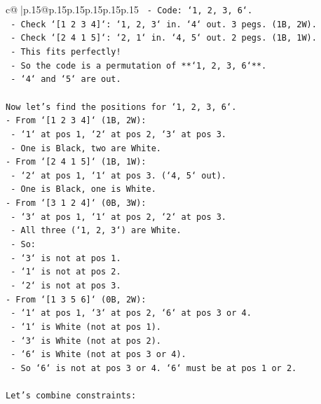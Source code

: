 \documentclass{article}
\begin{document}
{\begin{supertabular}{c@{$\;$}|p{.15\linewidth}@{}p{.15\linewidth}p{.15\linewidth}p{.15\linewidth}p{.15\linewidth}p{.15\linewidth}}
{{{\texttt{        {-} Code: `1, 2, 3, 6`.} \\
\texttt{        {-} Check `{[}1 2 3 4{]}`: `1, 2, 3` in. `4` out. 3 pegs. (1B, 2W).} \\
\texttt{        {-} Check `{[}2 4 1 5{]}`: `2, 1` in. `4, 5` out. 2 pegs. (1B, 1W).} \\
\texttt{        {-} This fits perfectly!} \\
\texttt{        {-} So the code is a permutation of **`1, 2, 3, 6`**.} \\
\texttt{        {-} `4` and `5` are out.} \\
\\ 
\texttt{Now let's find the positions for `1, 2, 3, 6`.} \\
\texttt{{-} From `{[}1 2 3 4{]}` (1B, 2W):} \\
\texttt{    {-} `1` at pos 1, `2` at pos 2, `3` at pos 3.} \\
\texttt{    {-} One is Black, two are White.} \\
\texttt{{-} From `{[}2 4 1 5{]}` (1B, 1W):} \\
\texttt{    {-} `2` at pos 1, `1` at pos 3. (`4, 5` out).} \\
\texttt{    {-} One is Black, one is White.} \\
\texttt{{-} From `{[}3 1 2 4{]}` (0B, 3W):} \\
\texttt{    {-} `3` at pos 1, `1` at pos 2, `2` at pos 3.} \\
\texttt{    {-} All three (`1, 2, 3`) are White.} \\
\texttt{    {-} So:} \\
\texttt{        {-} `3` is not at pos 1.} \\
\texttt{        {-} `1` is not at pos 2.} \\
\texttt{        {-} `2` is not at pos 3.} \\
\texttt{{-} From `{[}1 3 5 6{]}` (0B, 2W):} \\
\texttt{    {-} `1` at pos 1, `3` at pos 2, `6` at pos 3 or 4.} \\
\texttt{    {-} `1` is White (not at pos 1).} \\
\texttt{    {-} `3` is White (not at pos 2).} \\
\texttt{    {-} `6` is White (not at pos 3 or 4).} \\
\texttt{    {-} So `6` is not at pos 3 or 4. `6` must be at pos 1 or 2.} \\
\\ 
\texttt{Let's combine constraints:} \\
}}}
\end{supertabular}}
\end{document}
